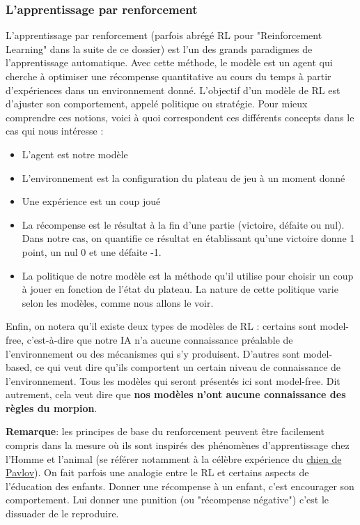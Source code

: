 \documentclass[french]{article}
\begin{document}
    \subsubsection{L'apprentissage par renforcement}
    L'apprentissage par renforcement (parfois abrégé RL pour "Reinforcement Learning" dans la suite de ce dossier) est l'un des grands paradigmes de l'apprentissage automatique. Avec cette méthode, le modèle est un agent qui cherche à optimiser une récompense quantitative au cours du temps à partir d'expériences dans un environnement donné. L'objectif d'un modèle de RL est d'ajuster son comportement, appelé politique ou stratégie. Pour mieux comprendre ces notions, voici à quoi correspondent ces différents concepts dans le cas qui nous intéresse :
    \begin{itemize}
        \item L'agent est notre modèle
        \item L'environnement est la configuration du plateau de jeu à un moment donné
        \item Une expérience est un coup joué 
        \item La récompense est le résultat à la fin d'une partie (victoire, défaite ou nul). Dans notre cas, on quantifie ce résultat en établissant qu'une victoire donne 1 point, un nul 0 et une défaite -1.
        \item La politique de notre modèle est la méthode qu'il utilise pour choisir un coup à jouer en fonction de l'état du plateau. La nature de cette politique varie selon les modèles, comme nous allons le voir.
    \end{itemize}

    Enfin, on notera qu'il existe deux types de modèles de RL : certains sont model-free, c'est-à-dire que notre IA n'a aucune connaissance préalable de l'environnement ou des mécanismes qui s'y produisent. D'autres sont model-based, ce qui veut dire qu'ils comportent un certain niveau de connaissance de l'environnement. Tous les modèles qui seront présentés ici sont model-free. Dit autrement, cela veut dire que \textbf{nos modèles n'ont aucune connaissance des règles du morpion}.
    
    \textbf{Remarque}: les principes de base du renforcement peuvent être facilement compris dans la mesure où ils sont inspirés des phénomènes d'apprentissage chez l'Homme et l'animal (se référer notamment à la célèbre expérience du \href{https://journals.openedition.org/bibnum/604}{chien de Pavlov}). On fait parfois une analogie entre le RL et certains aspects de l'éducation des enfants. Donner une récompense à un enfant, c'est encourager son comportement. Lui donner une punition (ou "récompense négative") c'est le dissuader de le reproduire.
\end{document}

